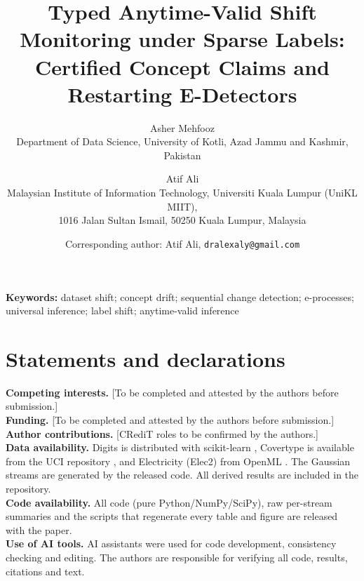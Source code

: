 \documentclass[11pt,a4paper]{article}
\title{\textbf{Typed Anytime-Valid Shift Monitoring under Sparse Labels:\\ Certified Concept Claims and Restarting E-Detectors}}
\author{%
Asher Mehfooz\\[1pt]
{\normalsize Department of Data Science, University of Kotli, Azad Jammu and Kashmir, Pakistan}
\and
Atif Ali\\[1pt]
{\normalsize Malaysian Institute of Information Technology, Universiti Kuala Lumpur (UniKL MIIT),}\\[-1pt]
{\normalsize 1016 Jalan Sultan Ismail, 50250 Kuala Lumpur, Malaysia}
}
\date{\small Corresponding author: Atif Ali, \texttt{dralexaly@gmail.com}}
\theoremstyle{definition}
\begin{document}
\maketitle

\begin{abstract}
\noindent

\end{abstract}

\noindent\textbf{Keywords:} dataset shift; concept drift; sequential change detection; e-processes; universal inference; label shift; anytime-valid inference









\section*{Statements and declarations}
\noindent\textbf{Competing interests.} [To be completed and attested by the authors before submission.]\\
\textbf{Funding.} [To be completed and attested by the authors before submission.]\\
\textbf{Author contributions.} [CRediT roles to be confirmed by the authors.]\\
\textbf{Data availability.} Digits is distributed with scikit-learn \citep{alpaydin1998}, Covertype is available from the UCI repository \citep{blackard1999}, and Electricity (Elec2) from OpenML \citep{harries1999}. The Gaussian streams are generated by the released code. All derived results are included in the repository.\\
\textbf{Code availability.} All code (pure Python/NumPy/SciPy), raw per-stream summaries and the scripts that regenerate every table and figure are released with the paper.\\
\textbf{Use of AI tools.} AI assistants were used for code development, consistency checking and editing. The authors are responsible for verifying all code, results, citations and text.




\end{document}

